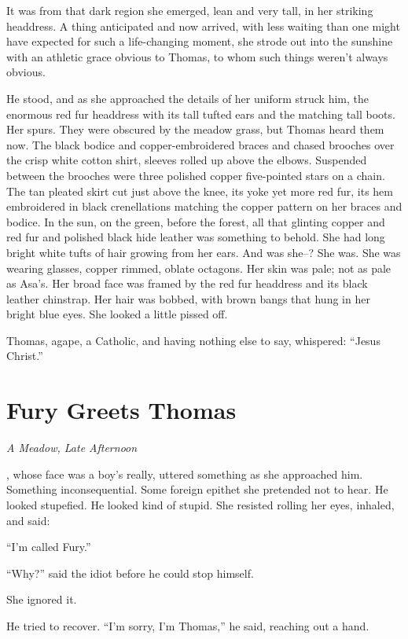 \documentclass[11pt,a5paper]{article}
\newcommand{\alet}[1]{\textit{#1}\vspace{1em}}
\begin{document}
It was from that dark region she emerged, lean and very tall, in her striking headdress. A thing anticipated and now arrived, with less waiting than one might have expected for such a life-changing moment, she strode out into the sunshine with an athletic grace obvious to Thomas, to whom such things weren't always obvious.

He stood, and as she approached the details of her uniform struck him, the enormous red fur headdress with its tall tufted ears and the matching tall boots. Her spurs. They were obscured by the meadow grass, but Thomas heard them now. The black bodice and copper-embroidered braces and chased brooches over the crisp white cotton shirt, sleeves rolled up above the elbows. Suspended between the brooches were three polished copper five-pointed stars on a chain. The tan pleated skirt cut just above the knee, its yoke yet more red fur, its hem embroidered in black crenellations matching the copper pattern on her braces and bodice. In the sun, on the green, before the forest, all that glinting copper and red fur and polished black hide leather was something to behold. She had long bright white tufts of hair growing from her ears. And was she--? She was. She was wearing glasses, copper rimmed, oblate octagons. Her skin was pale; not as pale as Asa's. Her broad face was framed by the red fur headdress and its black leather chinstrap. Her hair was bobbed, with brown bangs that hung in her bright blue eyes. She looked a little pissed off.

Thomas, agape, a Catholic, and having nothing else to say, whispered: ``Jesus Christ.''

\newpage

\section{Fury Greets Thomas}

\alet{A Meadow, Late Afternoon}

, whose face was a boy's really, uttered something as she approached him. Something inconsequential. Some foreign epithet she pretended not to hear. He looked stupefied. He looked kind of stupid. She resisted rolling her eyes, inhaled, and said:

``I'm called Fury.''

``Why?'' said the idiot before he could stop himself.

She ignored it.

He tried to recover. ``I'm sorry, I'm Thomas,'' he said, reaching out a hand.
\end{document}
